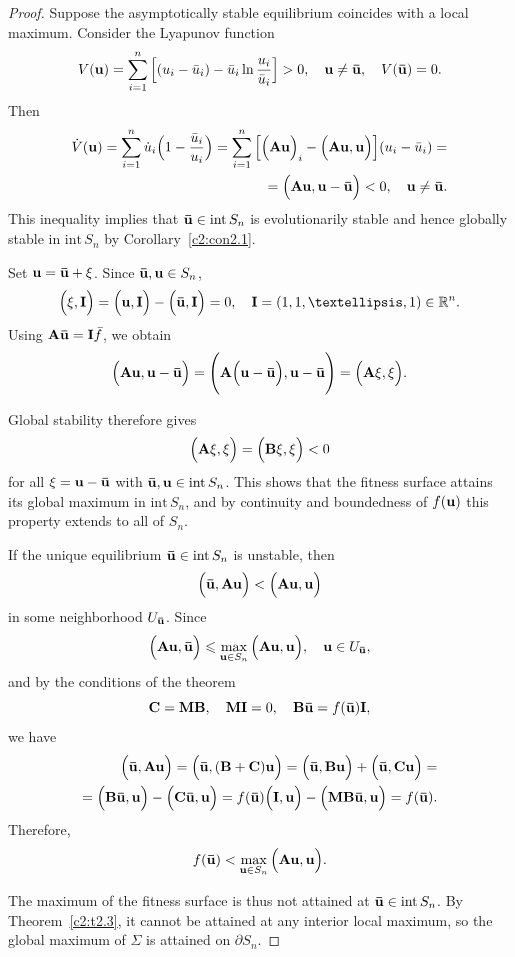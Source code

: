 \documentclass[10pt,a4paper]{amsart}
\newcommand{\R}{\mathbb{R}}
\newcommand{\bound}{\partial}
\newcommand{\inside}{\mathrm{int}\,}
\begin{document}
\begin{proof}
	Suppose the asymptotically stable equilibrium coincides with a local maximum. Consider the Lyapunov function
	$$
	V({\bf u}) = \sum\limits_{i = 1}^{n}\Big[(u_{i} - \bar{u}_{i}) - \bar{u}_{i}\ln{\frac{u_{i}}{\bar{u}_{i}}}\Big] > 0, \quad {\bf u} \neq {\bf \bar{u}}, \quad V({\bf \bar{u}}) = 0.
	$$
	Then
	\begin{align*}
		\dot{V}({\bf u}) = \sum\limits_{i = 1}^{n}\dot{u}_{i}\Big(1 - \frac{\bar{u}_{i}}{u_{i}}\Big) = \sum\limits_{i = 1}^{n}\Big[\Big({\bf Au}\Big)_{i} - \Big({\bf Au, u}\Big)\Big](u_{i} - \bar{u}_{i}) = \\ = \Big({\bf Au, u - \bar{u}}\Big) < 0, \quad {\bf u} \neq {\bf \bar{u}}.
	\end{align*}
	This inequality implies that ${\bf \bar{u}} \in \inside S_{n}$ is evolutionarily stable and hence globally stable in $\inside S_{n}$ by Corollary~\ref{c2:con2.1}.
	
	Set ${\bf u} = {\bf \bar{u} + \xi}$. Since ${\bf \bar{u}, u} \in S_{n}$,
	$$
	\Big({\bf \xi, I}\Big) = \Big({\bf u, I}\Big) - \Big({\bf \bar{u}, I}\Big) = 0, \quad {\bf I} = (1, 1, \ldots, 1) \in \R^{n}.
	$$
    Using ${\bf A\bar{u}} = {\bf I}\bar{f}$, we obtain
	$$
	\Big({\bf Au, u - \bar{u}}\Big) = \Bigg({\bf A}\Big({\bf u - \bar{u}}\Big), {\bf u - \bar{u}}\Bigg) = \Big({\bf A\xi, \xi}\Big).
	$$
	
	Global stability therefore gives
	$$
	\Big({\bf A\xi, \xi}\Big) = \Big({\bf B\xi, \xi}\Big) < 0
	$$ for all ${\bf \xi} = {\bf u - \bar{u}}$ with ${\bf \bar{u}, u} \in \inside S_{n}$. This shows that the fitness surface attains its global maximum in $\inside S_{n}$, and by continuity and boundedness of $f({\bf u})$ this property extends to all of $S_{n}$.
	
	If the unique equilibrium ${\bf \bar{u}} \in \inside S_{n}$ is unstable, then
	$$
	\Big({\bf \bar{u}, Au}\Big) < \Big({\bf Au, u}\Big)
	$$
	in some neighborhood $U_{{\bf \bar{u}}}$. Since
	$$
	\Big({\bf Au, \bar{u}}\Big) \leqslant \max\limits_{{\bf u} \in S_{n}}\Big({\bf Au, u}\Big), \quad {\bf u} \in U_{{\bf \bar{u}}},
	$$
	and by the conditions of the theorem 
    $${\bf C} = {\bf MB},\quad {\bf MI} = 0, \quad{\bf B\bar{u}} = f({\bf \bar{u}}){\bf I},$$ we have
	\begin{align*}
		\Big({\bf \bar{u}, Au}\Big) = \Big({\bf \bar{u}, (B + C)u}\Big) = \Big({\bf \bar{u}, Bu}\Big) + \Big({\bf \bar{u}, Cu}\Big) = \\ = \Big({\bf B\bar{u}, u}\Big) - \Big({\bf C\bar{u}, u}\Big) = f({\bf \bar{u}})\Big({\bf I, u}\Big) - \Big({\bf MB\bar{u}, u}\Big) = f({\bf \bar{u}}).
	\end{align*}
	Therefore,
	$$
	f({\bf \bar{u}}) < \max\limits_{{\bf u} \in S_{n}}\Big({\bf Au, u}\Big).
	$$
	
	The maximum of the fitness surface is thus not attained at ${\bf \bar{u}} \in \inside S_{n}$. By Theorem~\ref{c2:t2.3}, it cannot be attained at any interior local maximum, so the global maximum of $\Sigma$ is attained on $\bound S_{n}$. 
\end{proof}
\end{document}
